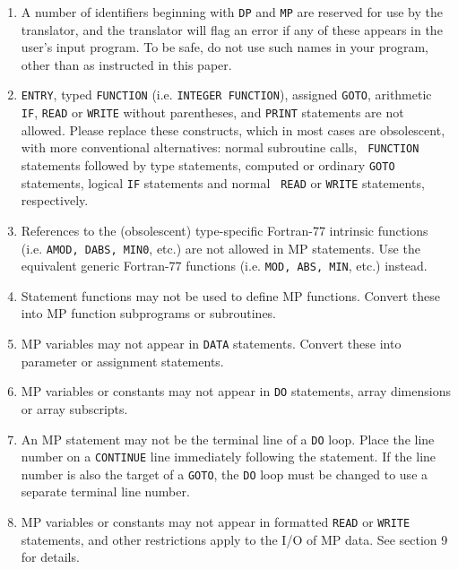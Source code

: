 \begin{enumerate}
 
\item A number of identifiers beginning with {\tt DP} and {\tt MP} are 
reserved for use by the translator, and the translator will flag an
error if any of these appears in the user's input program.  To be
safe, do not use such names in your program, other than as instructed
in this paper.

\item {\tt ENTRY}, typed {\tt FUNCTION} (i.e. {\tt INTEGER FUNCTION}),
assigned {\tt GOTO}, arithmetic {\tt IF}, {\tt READ} or {\tt WRITE}
without parentheses, and {\tt PRINT} statements are not allowed.
Please replace these constructs, which in most cases are obsolescent,
with more conventional alternatives: normal subroutine calls, {\tt
FUNCTION} statements followed by type statements, computed or ordinary
{\tt GOTO} statements, logical {\tt IF} statements and normal {\tt
READ} or {\tt WRITE} statements, respectively.
 
\item References to the (obsolescent) type-specific Fortran-77
intrinsic functions (i.e. {\tt AMOD, DABS, MIN0}, etc.) are not
allowed in MP statements.  Use the equivalent generic Fortran-77
functions (i.e. {\tt MOD, ABS, MIN}, etc.) instead.

\item Statement functions may not be used to define MP functions.
Convert these into MP function subprograms or subroutines.
 
\item MP variables may not appear in {\tt DATA} statements.  Convert
these into parameter or assignment statements.
 
\item MP variables or constants may not appear in {\tt DO} statements,
array dimensions or array subscripts.

\item An MP statement may not be the terminal line of a {\tt DO}
loop.  Place the line number on a {\tt CONTINUE} line immediately
following the statement.  If the line number is also the target of a
{\tt GOTO}, the {\tt DO} loop must be changed to use a separate
terminal line number.
 
\item MP variables or constants may not appear in formatted {\tt READ}
or {\tt WRITE} statements, and other restrictions apply to the I/O of
MP data.  See section 9 for details.


\end{enumerate}
